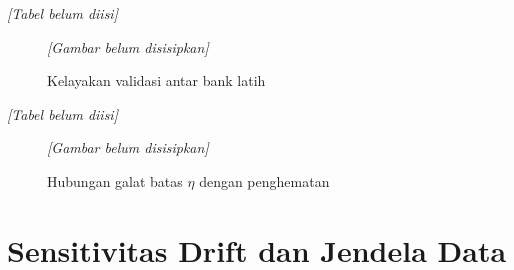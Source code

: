         \begin{table}[H]
            \centering
            \caption{Kelayakan validasi terhadap batas bank sendiri dan batas validasi}\label{tab:feasibility stability}
            \textit{[Tabel belum diisi]}
        \end{table}

        \begin{figure}[H]
            \centering
            \textit{[Gambar belum disisipkan]}
            \caption{Kelayakan validasi antar bank latih}\label{fig:feasibility validation}
        \end{figure}

        \begin{table}[H]
            \centering
            \caption{Stabilitas peringkat PSO dan GA antar bank latih}\label{tab:rank stability}
            \textit{[Tabel belum diisi]}
        \end{table}

        \begin{figure}[H]
            \centering
            \textit{[Gambar belum disisipkan]}
            \caption{Hubungan galat batas $\eta$ dengan penghematan}\label{fig:savings vs eta error}
        \end{figure}

    \section{Sensitivitas Drift dan Jendela Data}\label{sec:drift sensitivity}

